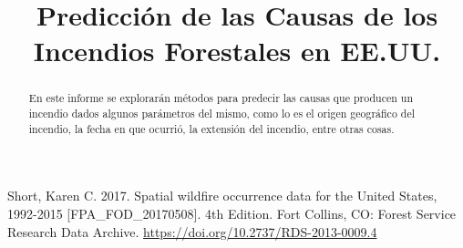 \documentclass[conference]{IEEEtran}
\begin{document}
\title{Predicción de las Causas de los Incendios Forestales en EE.UU.}

\author{
}

\maketitle

\begin{abstract}
En este informe se explorarán métodos para predecir las causas que producen un incendio dados algunos parámetros del mismo, como lo es el origen geográfico del incendio, la fecha en que ocurrió, la extensión del incendio, entre otras cosas.
\end{abstract}
















\begin{thebibliography}{00}
 Short, Karen C. 2017. Spatial wildfire occurrence data for the United States, 1992-2015 [FPA\_FOD\_20170508]. 4th Edition. Fort Collins, CO: Forest Service Research Data Archive. \url{https://doi.org/10.2737/RDS-2013-0009.4}

\end{thebibliography}
\end{document}

